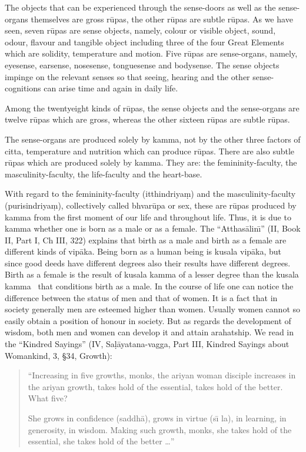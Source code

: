 \documentclass{book}
\begin{document}
The objects that can be experienced through the sense-doors as well as
the sense-organs themselves are gross r\=upas, the other r\=upas are
subtle r\=upas. As we have seen, seven r\=upas are sense objects,
namely, colour or visible object, sound, odour, flavour and tangible
object including three of the four Great Elements which are solidity,
temperature and motion. Five r\=upas are sense-organs, namely,
eyesense, earsense, nosesense, tonguesense and bodysense. The sense
objects impinge on the relevant senses so that seeing, hearing and the
other sense-cognitions can arise time and again in daily life. 

Among the twentyeight kinds of r\=upas, the sense objects and the
sense-organs are twelve r\=upas which are gross, whereas the other
sixteen r\=upas are subtle r\=upas.


The sense-organs are produced solely by kamma, not by the other
three factors of citta, temperature and nutrition which can produce
r\=upas. There are also subtle r\=upas which are produced solely by
kamma. They are: the femininity-faculty, the masculinity-faculty,
the life-faculty and the heart-base.

With regard to the femininity-faculty (itthindriya\d m) and the
mascu\-linity-faculty (purisindriya\d m), collectively called
bh\-var\=upa or sex, these are r\=upas produced by kamma from the
first moment of our life and throughout life. Thus, it is due to kamma
whether one is born as a male or as a female. The ``Atthas{\=a}lin\=\i''
(II, Book II, Part I, Ch III, 322) explains that birth as a male and
birth as a female are different kinds of vip{\=a}ka. Being born as a
human being is kusala vip{\=a}ka, but since good deeds have different
degrees also their results have different degrees. Birth as a female is
the result of kusala kamma of a lesser degree than the kusala kamma
\ that conditions birth as a male. In the course of life one can notice
the difference between the status of men and that of women. It is a
fact that in society generally men are esteemed higher than women.
Usually women cannot so easily obtain a position of honour in society.
But as regards the development of wisdom, both men and women can
develop it and attain arahatship. We read in the ``Kindred Sayings''
(IV, Sa\d l{\=a}yatana-vagga, Part III, Kindred Sayings about
Womankind, 3, {\S}34, Growth):

\begin{quote}\begin{flushleft}
``Increasing in five growths, monks, the ariyan woman disciple increases
in the ariyan growth, takes hold of the essential, takes hold of the
better. What five?

She grows in confidence (saddh{\=a}), grows in virtue (s\=\i{} la), in
learning, in generosity, in wisdom. Making such growth, monks, she
takes hold of the essential, she takes hold of the better \ldots''
\end{flushleft}\end{quote}
\end{document}
